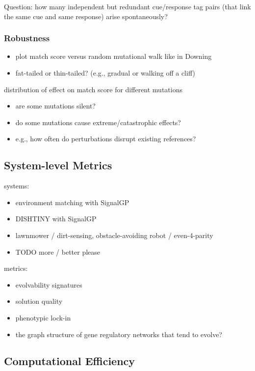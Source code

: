 Question: how many independent but redundant cue/response tag pairs (that link the same cue and same response) arise spontaneously?

\subsubsection{Robustness}

\begin{itemize}
\item plot match score versus random mutational walk like in Downing
\item fat-tailed or thin-tailed? (e.g., gradual or walking off a cliff)
\end{itemize}

distribution of effect on match score for different mutations
\begin{itemize}
\item are some mutations silent?
\item do some mutations cause extreme/catastrophic effects?
\item e.g., how often do perturbations disrupt existing references?
\end{itemize}

\subsection{System-level Metrics}

systems:
\begin{itemize}
\item environment matching with SignalGP
\item DISHTINY with SignalGP
\item lawnmower \citep{spector2011tag} / dirt-sensing, obstacle-avoiding robot \citep{spector2011tag} / even-4-parity \citep{spector2012tag}
\item TODO more / better please
\end{itemize}

metrics:
\begin{itemize}
\item evolvability signatures \citep{tarapore2015evolvability}
\item solution quality
\item phenotypic lock-in
\item the graph structure of gene regulatory networks that tend to evolve?
\end{itemize}

\subsection{Computational Efficiency}

